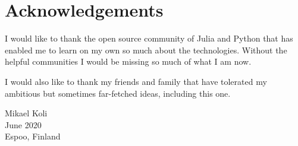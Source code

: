 \section*{Acknowledgements}

I would like to thank the open source community of Julia and Python
that has enabled me to learn on my own so much about the technologies.
Without the helpful communities I would be missing so much of what
I am now.

I would also like to thank my friends and family that have tolerated
my ambitious but sometimes far-fetched ideas, including this one.

Mikael Koli\\
June 2020\\ %
Espoo, Finland\\
